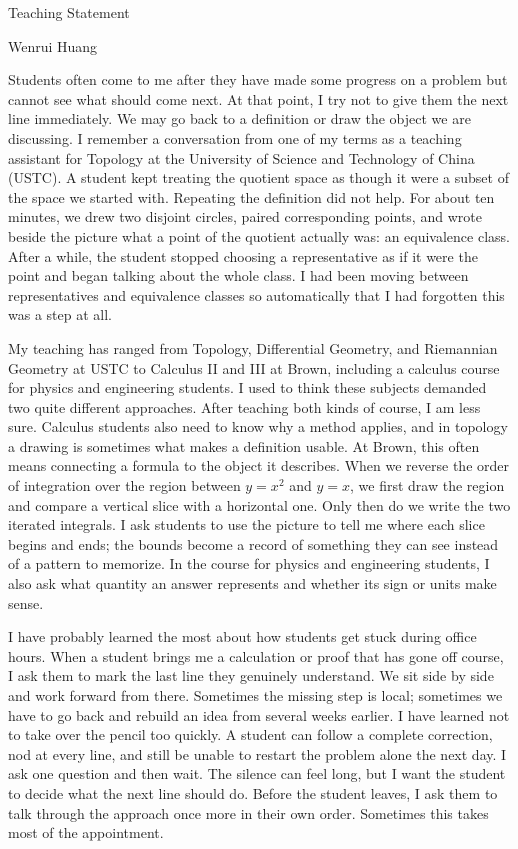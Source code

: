 \documentclass[11pt,reqno]{amsart}
\begin{document}
\begin{center}
{\LARGE Teaching Statement}\bigskip

{\large Wenrui Huang}
\end{center}
\vskip 22pt

Students often come to me after they have made some progress on a problem but
cannot see what should come next. At that point, I try not to give them the
next line immediately. We may go back to a definition or draw the object we
are discussing. I remember a conversation from one of my terms as a teaching
assistant for Topology at the University of Science and Technology of China
(USTC). A student kept treating the quotient space as though it were a subset
of the space we started with. Repeating the definition did not help. For about
ten minutes, we drew two disjoint circles, paired corresponding points, and
wrote beside the picture what a point of the quotient actually was: an
equivalence class. After a while, the student stopped choosing a representative
as if it were the point and began talking about the whole class. I had been
moving between representatives and equivalence classes so automatically that
I had forgotten this was a step at all.

My teaching has ranged from Topology, Differential Geometry, and Riemannian
Geometry at USTC to Calculus II and III at Brown, including a calculus course
for physics and engineering students. I used to think these subjects demanded
two quite different approaches. After teaching both kinds of course, I am less
sure. Calculus students also need to know why a method applies, and in topology
a drawing is sometimes what makes a definition usable. At Brown, this often
means connecting a formula to the object it describes. When we reverse the
order of integration over the region between
$y=x^2$ and $y=x$, we first draw the region and compare a vertical slice with a
horizontal one. Only then do we write the two iterated integrals. I ask
students to use the picture to tell me where each slice begins and ends; the
bounds become a record of something they can see instead of a pattern to
memorize. In the course for physics and engineering students, I also ask what
quantity an answer represents and whether its sign or units make sense.

I have probably learned the most about how students get stuck during office
hours. When a student brings me a calculation or proof that has gone off
course, I ask them to mark the last line they genuinely understand. We sit
side by side and work forward from there. Sometimes the missing step is local;
sometimes we have to go back and rebuild an idea from several weeks earlier. I
have learned not to take over the pencil too quickly. A student can follow a
complete correction, nod at every line, and still be unable to restart the
problem alone the next day. I ask one question and then wait. The silence can
feel long, but I want the student to decide what the next line should do.
Before the student leaves, I ask them to talk through the approach once more
in their own order. Sometimes this takes most of the appointment.
\end{document}
